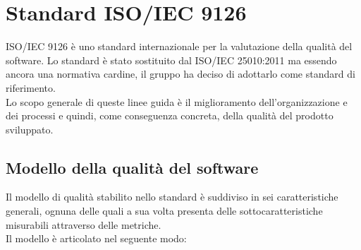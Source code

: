 \section{Standard ISO/IEC 9126}
ISO/IEC 9126 è uno standard internazionale per la valutazione della qualità del software. Lo standard è stato sostituito dal ISO/IEC 25010:2011 ma essendo ancora una normativa cardine, il gruppo \Omicron{} ha deciso di adottarlo come standard di riferimento. \\
Lo scopo generale di queste linee guida è il miglioramento dell'organizzazione e dei processi e quindi, come conseguenza concreta, della qualità del prodotto sviluppato.

\subsection{Modello della qualità del software}
Il modello di qualità stabilito nello standard è suddiviso in sei caratteristiche generali, ognuna delle quali a sua volta presenta delle sottocaratteristiche misurabili attraverso delle metriche. \\
Il modello è articolato nel seguente modo:
